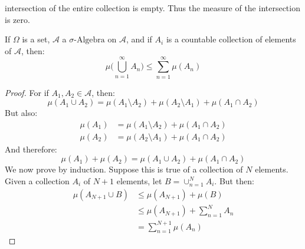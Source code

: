                     intersection of the entire collection is empty.
                    Thus the measure of the intersection is zero.
                    \begin{theorem}
                        If $\Omega$ is a set, $\mathcal{A}$ a
                        $\sigma\text{-Algebra}$ on $\mathcal{A}$, and
                        if $A_{i}$ is a countable collection of elements
                        of $\mathcal{A}$, then:
                        \begin{equation}
                            \mu\Big(\bigcup_{n=1}^{\infty}A_{n}\Big)
                            \leq\sum_{n=1}^{\infty}\mu(A_{n})
                        \end{equation}
                    \end{theorem}
                    \begin{proof}
                        For if $A_{1},A_{2}\in\mathcal{A}$, then:
                        \begin{equation}
                            \mu(A_{1}\cup{A}_{2})=
                            \mu(A_{1}\setminus{A}_{2})+
                            \mu(A_{2}\setminus{A}_{1})+
                            \mu(A_{1}\cap{A}_{2})
                        \end{equation}
                        But also:
                        \begin{align}
                            \mu(A_{1})&=
                            \mu(A_{1}\setminus{A}_{2})+
                            \mu(A_{1}\cap{A}_{2})\\
                            \mu(A_{2})&=
                            \mu(A_{2}\setminus{A}_{1})+
                            \mu(A_{1}\cap{A}_{2})
                        \end{align}
                        And therefore:
                        \begin{equation}
                            \mu(A_{1})+\mu(A_{2})=
                            \mu(A_{1}\cup{A}_{2})+\mu(A_{1}\cap{A}_{2})
                        \end{equation}
                        We now prove by induction. Suppose this is true
                        of a collection of $N$ elements. Given a collection
                        $A_{i}$ of $N+1$ elements, let
                        $B=\cup_{n=1}^{N}A_{i}$. But then:
                        \begin{align}
                            \mu(A_{N+1}\cup{B})&
                            \leq\mu(A_{N+1})+\mu(B)\\
                            &\leq\mu(A_{N+1})+\sum_{n=1}^{N}A_{n}\\
                            &=\sum_{n=1}^{N+1}\mu(A_{n})
                        \end{align}
                    \end{proof}
